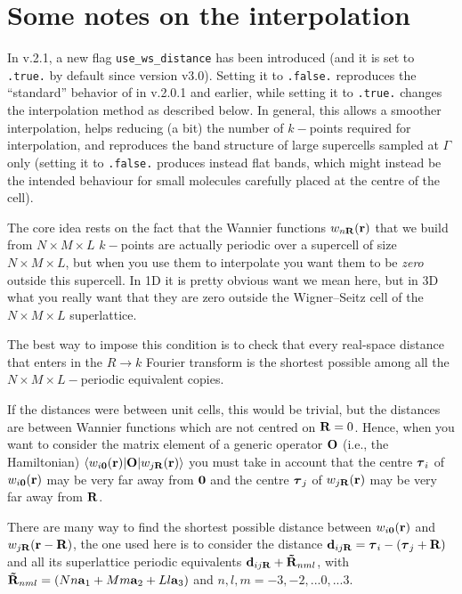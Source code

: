 \chapter{\label{chap:interpolation}Some notes on the interpolation}

In \wannier{} v.2.1, a new flag {\tt use\_ws\_distance} has been 
introduced (and it is set to {\tt .true.} by default since
version v3.0). Setting it to {\tt .false.} reproduces the 
``standard'' behavior of \wannier{} in v.2.0.1 and earlier,
while setting it to {\tt .true.} changes the interpolation method
as described below. In general, this allows a smoother interpolation,
helps reducing (a bit) the number of $k-$points required for interpolation,
and reproduces the band structure of large supercells sampled at $\Gamma$ 
only (setting it to {\tt .false.} produces instead flat bands, which 
might instead be the intended behaviour for small molecules carefully
placed at the centre of the cell).

The core idea rests on the fact that the Wannier functions $w_{n\bm{\mathrm{R}}}(\bm{\mathrm{r}})$
that we build from $N\times M\times L$ $k-$points are actually periodic 
over a supercell of size $N\times M\times L$, but when you use 
them to interpolate you want them to be \emph{zero} outside this supercell. 
In 1D it is pretty obvious want we mean here, but in 3D what you really 
want that they are zero outside the Wigner--Seitz cell of the 
$N\times M\times L$ superlattice.

The best way to impose this condition is to check that every real-space 
distance that enters in the $R\to k$ Fourier transform is the shortest possible 
among all the $N\times M\times L-$periodic equivalent copies. 

If the distances were between unit cells, this would be trivial, but the 
distances are between Wannier functions which are not centred on $\bm{\mathrm{R}}=0$. 
Hence, when you want to consider the matrix element of a generic operator $\bm{\mathrm{O}}$
(i.e., the Hamiltonian)  $\langle w_{i\bm{\mathrm{0}}}(\bm{\mathrm{r}})|\bm{\mathrm{O}}|w_{j\bm{\mathrm{R}}}(\bm{\mathrm{r}})\rangle$ 
you must take in account that the centre $\bm{\mathrm{\tau}}_i$ of $w_{i\bm{\mathrm{0}}}(\bm{\mathrm{r}})$ may 
be very far away from $\bm{\mathrm{0}}$ and the centre $\bm{\mathrm{\tau}}_j$ of $w_{j\bm{\mathrm{R}}}(\bm{\mathrm{r}})$
may be very far away from $\bm{\mathrm{R}}$.

There are many way to find the shortest possible distance between $w_{i\bm{\mathrm{0}}}(\bm{\mathrm{r}})$ and 
$w_{j\bm{\mathrm{R}}}(\bm{\mathrm{r}}-\bm{\mathrm{R}})$, the one used here is to consider the distance
$\bm{\mathrm{d}}_{ij\bm{\mathrm{R}}} = \bm{\mathrm{\tau}}_i - (\bm{\mathrm{\tau}}_j+\bm{\mathrm{R}})$
and all its superlattice periodic equivalents
$\bm{\mathrm{d}}_{ij\bm{\mathrm{R}}}+ \bm{\mathrm{\tilde R}}_{nml}$, with 
$\bm{\mathrm{\tilde R}}_{nml} = (Nn\bm{\mathrm{a}}_1 + Mm\bm{\mathrm{a}}_2 + Ll\bm{\mathrm{a}}_3)$
and $n,l,m = {-3,-2,...0,...3}$.

